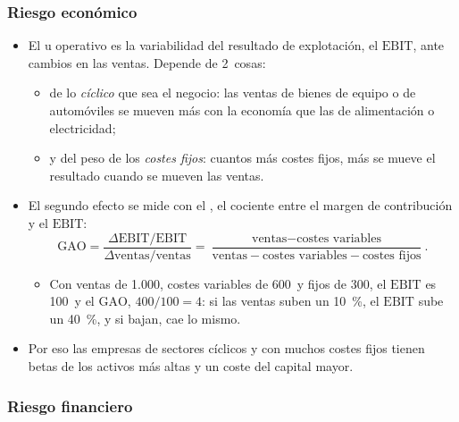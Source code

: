 \documentclass[11pt]{article}
\begin{document}
\subsubsection{Riesgo económico}\label{sec:riesgo-economico}

\begin{itemize}
\item El  u operativo es la variabilidad del resultado de explotación, el $\mathrm{EBIT}$, ante cambios en las ventas. Depende de 2~cosas:
  \begin{itemize}
  \item de lo \emph{cíclico} que sea el negocio: las ventas de bienes de equipo o de automóviles se mueven más con la economía que las de alimentación o electricidad;
  \item y del peso de los \emph{costes fijos}: cuantos más costes fijos, más se mueve el resultado cuando se mueven las ventas.
  \end{itemize}
\item El segundo efecto se mide con el , el cociente entre el margen de contribución y el $\mathrm{EBIT}$:
  \[
  \mathrm{GAO}=\frac{\Delta\mathrm{EBIT}/\mathrm{EBIT}}{\Delta\text{ventas}/\text{ventas}}=\frac{\text{ventas}-\text{costes variables}}{\text{ventas}-\text{costes variables}-\text{costes fijos}}.
  \]
  \begin{itemize}
  \item Con ventas de 1.000, costes variables de 600~y fijos de 300, el $\mathrm{EBIT}$ es 100~y el $\mathrm{GAO}$, $400/100=4$: si las ventas suben un 10~\%, el $\mathrm{EBIT}$ sube un 40~\%, y si bajan, cae lo mismo.
  \end{itemize}
\item Por eso las empresas de sectores cíclicos y con muchos costes fijos tienen betas de los activos más altas y un coste del capital mayor\nocite{BrealeyMyersAllen2020Principles}.
\end{itemize}

\subsubsection{Riesgo financiero}\label{sec:riesgo-financiero}
\end{document}
